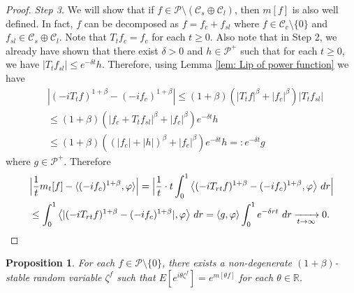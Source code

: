 \documentclass[12pt,a4paper]{amsart}
\theoremstyle{plain}
\newtheorem{prop}[thm]{Proposition}
\theoremstyle{definition}
\numberwithin{equation}{section}
\begin{document}
\begin{proof}
  \emph{Step 3.} We will show that if $f\in \mathcal P \setminus (\mathcal C_s \oplus \mathcal C_l)$, then $m[f]$ is also well defined.
  In fact, $f$ can be decomposed as $f = f_c + f_{sl}$ where $f \in \mathcal C_c\setminus \{0\}$ and $f_{sl}\in \mathcal C_s \oplus \mathcal C_l$.
  Note that $T_t f_c = f_c$ for each $t\geq 0$.
  Also note that in Step 2, we already have shown that there exist $\delta > 0$ and $h \in \mathcal P^+$ such that for each $t\geq 0$, we have $|T_t f_{sl}| \leq e^{- \delta t}h$.
  Therefore, using Lemma \ref{lem: Lip of power function} we have
  \begin{align}
    &|(-iT_t f)^{1+\beta} - (-i f_c)^{1+\beta}|
      \leq (1+\beta) ( |T_tf|^\beta + |f_c|^\beta) |T_tf_{sl}|
    \\&\leq (1+\beta) ( |f_c + T_t f_{sl}|^\beta + |f_c|^\beta) e^{- \delta t} h
    \\&\leq (1+\beta) ( (|f_c| + |h|)^\beta + |f_c|^\beta) e^{- \delta t} h
    =: e^{- \delta t} g
  \end{align}
  where $g\in \mathcal P^+$.
  Therefore
  \begin{align}
    \label{eq:P:S:1}
    &\Big| \frac{1}{t} m_t[f] - \langle (-if_c)^{1+\beta}, \varphi\rangle\Big|
      = \Big| \frac{1}{t} \cdot t \int_0^1  \big\langle (-iT_{rt}f)^{1+\beta} - (-if_c)^{1+\beta}, \varphi\big \rangle ~dr \Big|\\
    &\leq \int_0^1  \big\langle |(-iT_{rt}f)^{1+\beta} - (-if_c)^{1+\beta}|, \varphi\big \rangle ~dr = \langle g,\varphi\rangle\int_0^1 e^{-\delta rt} ~dr
      \xrightarrow[t\to \infty]{} 0.
      \qedhere
  \end{align}
\end{proof}

\begin{prop}
  \label{prop:PL:S}
  For each $f \in \mathcal P\setminus \{0\}$, there exists a non-degenerate $(1+\beta)$-stable random variable $\zeta^f$ such that $ E[e^{i\theta\zeta^f}] = e^{m[\theta f]}$ for each $\theta \in \mathbb R$.
\end{prop}
\end{document}
